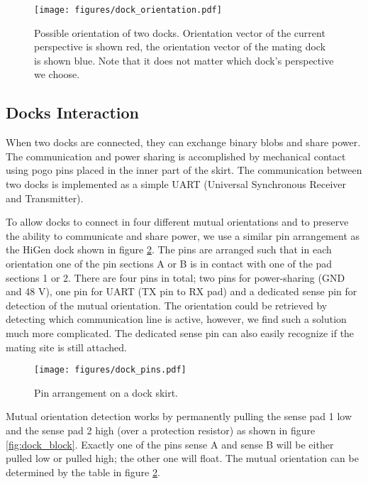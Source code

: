 \begin{figure}[!ht]
    \centering
    \texttt{[image: figures/dock\_orientation.pdf]}
    \caption{Possible orientation of two docks. Orientation vector of the
    current perspective is shown red, the orientation vector of the mating dock
    is shown blue. Note that it does not matter which dock's perspective we
    choose.}
    \label{fig:dock_orientation}
\end{figure}


\subsection{Docks Interaction}\label{sec:dock_interaction}

When two docks are connected, they can exchange binary blobs and share power.
The communication and power sharing is accomplished by mechanical contact using
pogo pins placed in the inner part of the skirt. The communication between two
docks is implemented as a simple UART (Universal Synchronous Receiver and
Transmitter).

To allow docks to connect in four different mutual orientations and to preserve
the ability to communicate and share power, we use a similar pin arrangement as
the HiGen dock \cite{parrott_higen:_2014} shown in figure \ref{fig:dock_pins}.
The pins are arranged such that in each orientation one of the pin sections A or
B is in contact with one of the pad sections 1 or 2. There are four pins in
total; two pins for power-sharing (GND and 48 V), one pin for UART (TX pin to RX
pad) and a dedicated sense pin for detection of the mutual orientation. The
orientation could be retrieved by detecting which communication line is active,
however, we find such a solution much more complicated. The dedicated sense pin
can also easily recognize if the mating site is still attached.

\begin{figure}[t]
    \centering
    \texttt{[image: figures/dock\_pins.pdf]}
    \caption{Pin arrangement on a dock skirt. }
    \label{fig:dock_pins}
\end{figure}

Mutual orientation detection works by permanently pulling the sense pad 1 low
and the sense pad 2 high (over a protection resistor) as shown in figure
\ref{fig:dock_block}. Exactly one of the pins sense A and sense B will be either
pulled low or pulled high; the other one will float. The mutual orientation can
be determined by the table in figure \ref{fig:dock_pins}.

